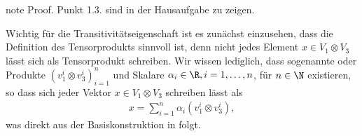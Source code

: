 \documentclass[letterpaper,10pt,english]{jupyterBook}
\begin{document}
\begin{sphinxadmonition}{note}
\sphinxAtStartPar
Proof. Punkt 1.\sphinxhyphen{}3. sind in der Hausaufgabe zu zeigen.

\sphinxAtStartPar
{}

\sphinxAtStartPar
Wichtig für die Transitivitätseigenschaft ist es zunächst einzusehen, dass die Definition des Tensorprodukts sinnvoll ist, denn nicht jedes Element \(x\in V_1\otimes V_3\) lässt sich  als Tensorprodukt schreiben.
Wir wissen lediglich, dass  sogenannte  oder  Produkte \((v_1^i\otimes v_3^i)_{i=1}^n\) und Skalare \(\alpha_i\in\R, i=1,\ldots,n\), für \(n\in\N\) existieren, so dass sich jeder Vektor \(x \in V_1 \otimes V_3\) schreiben lässt als
\begin{equation*}
\begin{split}x = \sum_{i=1}^n \alpha_i (v_1^i \otimes v_3^i),\end{split}
\end{equation*}
\sphinxAtStartPar
was direkt aus der Basiskonstruktion in {\hyperref[\detokenize{vektoranalysis/tensor:thm:existenzTensorprodukt}]{}} folgt.


\end{sphinxadmonition}
\end{document}
